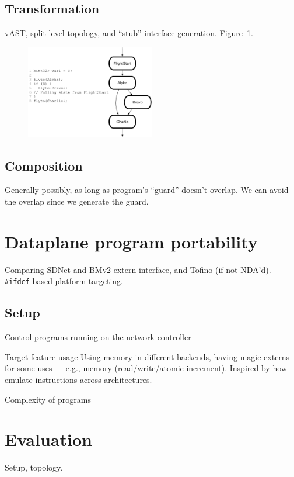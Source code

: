\documentclass[letterpaper,twocolumn,10pt]{article}
\begin{document}
\subsection{Transformation}
vAST, split-level topology, and ``stub'' interface generation.
Figure~\ref{fig:split-level-topology}.

\begin{figure}[t]
\centering
\includegraphics[width=0.5\textwidth]{split_level_topology.pdf}
\caption{\label{fig:split-level-topology}
\TODO{}  
}
\end{figure}

\subsection{Composition}
Generally possibly, as long as program's ``guard'' doesn't overlap. We can avoid the overlap since we generate the guard.


\section{Dataplane program portability}
Comparing SDNet and BMv2 extern interface,
and Tofino (if not NDA'd).
\verb+#ifdef+-based platform targeting.


\subsection{Setup}
Control programs running on the network controller

Target-feature usage
Using memory in different backends, having magic externs for some uses — e.g., memory (read/write/atomic increment).
 Inspired by how emulate instructions across architectures.

Complexity of programs


\section{Evaluation}
Setup, topology.
\end{document}
